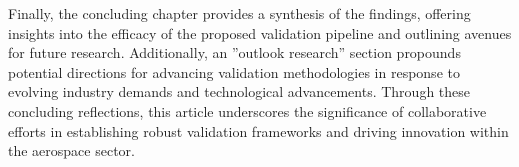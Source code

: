 %
\indent Finally, the concluding chapter provides a synthesis of the findings, offering insights into the efficacy of the proposed validation pipeline and outlining avenues for future research. Additionally, an ''outlook research'' section propounds potential directions for advancing validation methodologies in response to evolving industry demands and technological advancements. Through these concluding reflections, this article underscores the significance of collaborative efforts in establishing robust validation frameworks and driving innovation within the aerospace sector.
